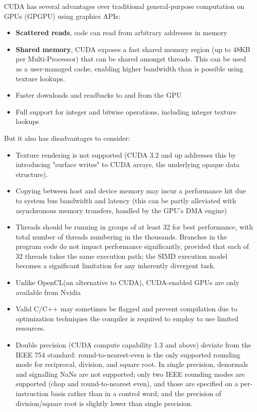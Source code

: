 \documentclass[a4paper,onesided,12pt]{report}
\begin{document}
 CUDA has several advantages over traditional general-purpose computation on GPUs (GPGPU) using graphics APIs:
 \begin{itemize}
 \item \textbf{Scattered reads}, code can read from arbitrary addresses in memory
 \item \textbf{Shared memory}, CUDA exposes a fast shared memory region (up to 48KB per Multi-Processor) that can be shared amongst threads. This can be used as a user-managed cache, enabling higher bandwidth than is possible using texture lookups.
 \item Faster downloads and readbacks to and from the GPU
 \item Full support for integer and bitwise operations, including integer texture lookups
 \end{itemize}
 But it also has disadvantages to consider:
 \begin{itemize}
 \item Texture rendering is not supported (CUDA 3.2 and up addresses this by introducing "surface writes" to CUDA arrays, the underlying opaque data structure).
 \item Copying between host and device memory may incur a performance hit due to system bus bandwidth and latency (this can be partly alleviated with asynchronous memory transfers, handled by the GPU's DMA engine)
 \item Threads should be running in groups of at least 32 for best performance, with total number of threads numbering in the thousands. Branches in the program code do not impact performance significantly, provided that each of 32 threads takes the same execution path; the SIMD execution model becomes a significant limitation for any inherently divergent task.
 \item Unlike OpenCL(an alternative to CUDA), CUDA-enabled GPUs are only available from Nvidia
 \item Valid C/C++ may sometimes be flagged and prevent compilation due to optimization techniques the compiler is required to employ to use limited resources.
 \item Double precision (CUDA compute capability 1.3 and above) deviate from the IEEE 754 standard: round-to-nearest-even is the only supported rounding mode for reciprocal, division, and square root. In single precision, denormals and signalling NaNs are not supported; only two IEEE rounding modes are supported (chop and round-to-nearest even), and those are specified on a per-instruction basis rather than in a control word; and the precision of division/square root is slightly lower than single precision.
 \end{itemize}
 
\end{document}
